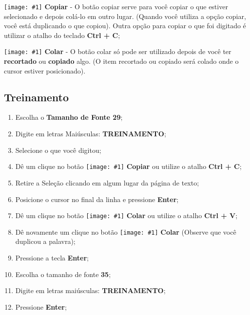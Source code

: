 \documentclass[hidelinks,12pt]{article}
\newcommand{\icon}[1]{\texttt{[image: \#1]}}
\begin{document}
\icon{Figures/copiar} \textbf{Copiar} - O botão copiar serve para você copiar o que estiver selecionado e depois colá-lo em outro lugar. (Quando você utiliza a opção copiar, você está duplicando o que copiou). Outra opção para copiar o que foi digitado é utilizar o atalho do teclado \textbf{Ctrl + C};

\icon{Figures/colar} \textbf{Colar} - O botão colar só pode ser utilizado depois de você ter \textbf{recortado} ou \textbf{copiado} algo. (O item recortado ou copiado será colado onde o cursor estiver posicionado).

\subsection{Treinamento}

\begin{enumerate}
	\item Escolha o \textbf{Tamanho de Fonte 29};

	\item Digite em letras Maiúsculas: \textbf{TREINAMENTO};

	\item Selecione o que você digitou;

	\item Dê um clique no botão \icon{Figures/copiar} \textbf{Copiar} ou utilize o atalho \textbf{Ctrl + C};

	\item Retire a Seleção clicando em algum lugar da página de texto;

	\item Posicione o cursor no final da linha e pressione \textbf{Enter};

	\item Dê um clique no botão \icon{Figures/colar} \textbf{Colar} ou utilize o atalho \textbf{Ctrl + V};

	\item Dê novamente um clique no botão \icon{Figures/colar}  \textbf{Colar} (Observe que você duplicou a palavra);

	\item Pressione a tecla \textbf{Enter};

	\item Escolha o tamanho de fonte \textbf{35};

	\item Digite em letras maiúsculas: \textbf{TREINAMENTO};

	\item Pressione \textbf{Enter};


\end{enumerate}
\end{document}
